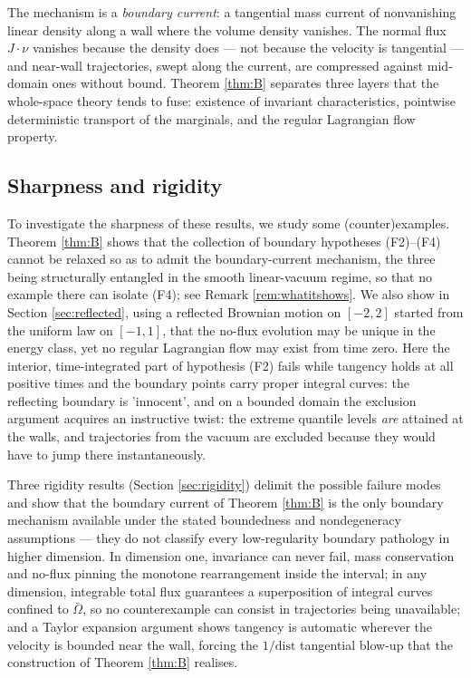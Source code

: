 \documentclass[11pt]{amsart}
\theoremstyle{definition}
\begin{document}
The mechanism is a \emph{boundary current}: a tangential mass current
of nonvanishing linear density along a wall where the volume density
vanishes. The normal flux $J\cdot\nu$ vanishes because the density
does --- not because the velocity is tangential --- and near-wall
trajectories, swept along the current, are compressed against
mid-domain ones without bound. Theorem \ref{thm:B} separates three
layers that the whole-space theory tends to fuse: existence of
invariant characteristics, pointwise deterministic transport of the
marginals, and the regular Lagrangian flow property.

\subsection{Sharpness and rigidity}

To investigate the sharpness of these results, we study some  (counter)examples. Theorem \ref{thm:B} shows that the
collection of boundary hypotheses \textup{(F2)--(F4)} cannot be
relaxed so as to admit the boundary-current mechanism, the three
being structurally entangled in the smooth linear-vacuum regime, so
that no example there can isolate \textup{(F4)}; see Remark
\ref{rem:whatitshows}. We also show in Section
\ref{sec:reflected}, using a reflected Brownian motion on $[-2,2]$ started from the uniform law on $[-1,1]$, that the
no-flux evolution may be unique in the energy class, yet no regular Lagrangian flow may exist
from time zero. Here the interior, time-integrated part of hypothesis
(F2)  fails
while tangency holds at all positive times and the boundary points
carry proper integral curves: the reflecting boundary is 
'innocent', and on a bounded domain the exclusion argument acquires an
instructive twist: the extreme quantile levels \emph{are} attained
at the walls, and trajectories from the vacuum are excluded because
they would have to jump there instantaneously.

Three rigidity results (Section \ref{sec:rigidity})  delimit the
possible failure modes and show that the boundary current of Theorem
\ref{thm:B} is the only boundary mechanism available under the
stated boundedness and nondegeneracy assumptions --- they do not
classify every low-regularity boundary pathology in higher
dimension. In
dimension one, invariance can never fail, mass conservation and
no-flux pinning the monotone rearrangement inside the interval; in
any dimension, integrable total flux guarantees a superposition of
integral curves confined to $\bar\Omega$, so no counterexample can
consist in trajectories being unavailable; and a Taylor expansion
argument shows tangency is automatic wherever the velocity is bounded
near the wall, forcing the $1/\mathrm{dist}$ tangential blow-up that
the construction of Theorem \ref{thm:B} realises.
\end{document}
